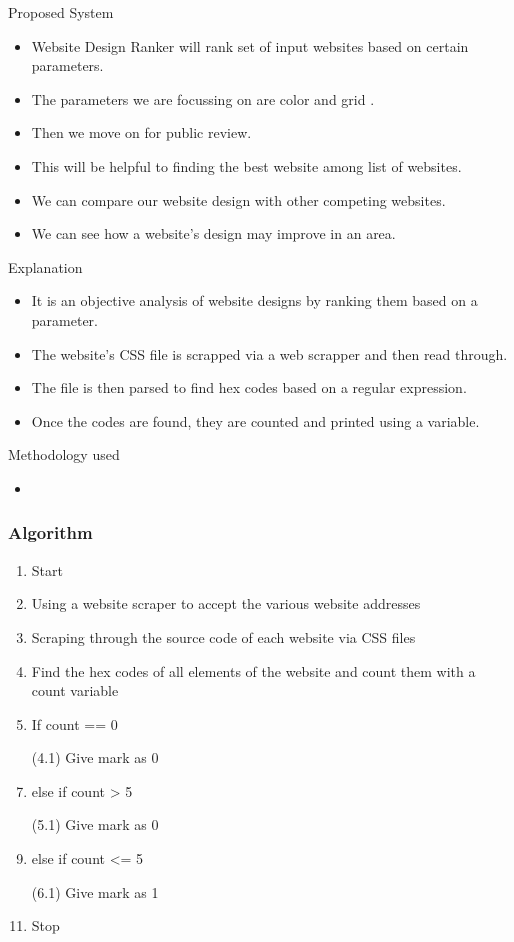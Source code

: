 \documentclass[11pt]{beamer}
\begin{document}
	\begin{frame}{Proposed System}
			\begin{itemize}
			\item Website Design Ranker will rank set of input websites based on certain parameters.
			\item The parameters we are focussing on are color and grid .
			\item Then we move on for public review.
			\item This will be helpful to finding the best website among list of websites.
			\item We can compare our website design with other competing websites.
			\item We can see how a website's design may improve in an area.

			\end{itemize}
	\end{frame}
	\begin{frame}{Explanation }
		\begin{itemize}
			\item It is an objective analysis of website designs by ranking them based on a parameter.
			\item The website's CSS file is scrapped via a web scrapper and then read through.
			\item The file is then parsed to find hex codes based on a regular expression.
			\item Once the codes are found, they are counted and printed using a variable.
		\end{itemize}
	\end{frame}
		\begin{frame}{Methodology used}
	\begin{itemize}
		\item 
	\end{itemize}
	\end{frame}
	\begin{frame}
	\frametitle{{Algorithm}}
	\begin{enumerate}
	\item Start
	\item Using a website scraper to accept the various website addresses
	\item Scraping through the source code of each website via CSS files
	\item Find the hex codes of all elements of the website and count them with a count variable
	\item If count == 0
	\item [(4.1)] Give mark as 0
	\item else if count > 5
	\item [(5.1)] Give mark as 0
	\item else if count <= 5
	\item [(6.1)] Give mark as 1
	\item Stop
	\end{enumerate}
	
	\end{frame}
\end{document}

